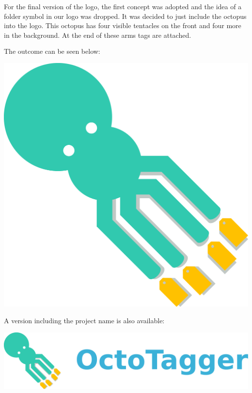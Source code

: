 For the final version of the logo, the first concept was adopted and the idea of a folder symbol in our logo was dropped. It was decided to just include the octopus into the logo. This octopus has four visible tentacles on the front and four more in the background. At the end of these arms tags are attached.

The outcome can be seen below:


\begin{center}
\includegraphics[scale=0.30]{images/logo.png}
\end{center}

A version including the project name is also available:

\begin{center}
\includegraphics[scale=0.30]{images/logo_text.png}
\end{center}